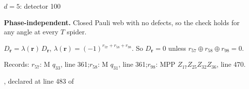 \label{d5_det100}
{\Large $d=5$: detector 100}\par
\textbf{Phase-independent.} Closed Pauli web with no defects, so the check holds for any angle at every $T$ spider.
\begin{center}
\end{center}
\vspace{-1mm}
$D_{\boldsymbol r}=\lambda(\boldsymbol r)\,D_{\boldsymbol r}$, \quad $\lambda(\boldsymbol r)=(-1)^{r_{57}+r_{58}+r_{98}}$. \qquad So $D_{\boldsymbol r}=0$ unless $r_{57}\oplus r_{58}\oplus r_{98}=0$.
\par\smallskip\begin{minipage}{.98\linewidth}\small Records: $r_{57}$: M $q_{33}$, line 361;\quad $r_{58}$: M $q_{31}$, line 361;\quad $r_{98}$: MPP $Z_{17}Z_{25}Z_{32}Z_{36}$, line 470.\end{minipage}
\vfill
{\footnotesize\texttt{}, declared at line 483 of \texttt{}}
\newpage

